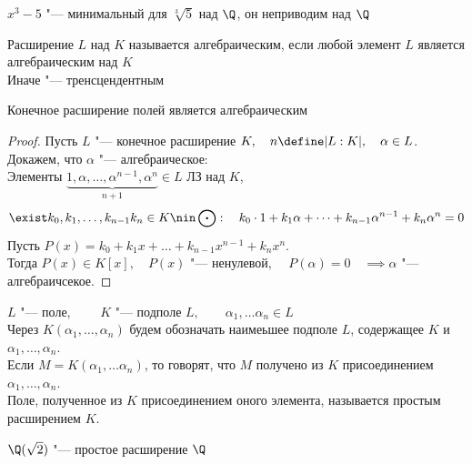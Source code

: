 \begin{eg}
	$ x^3 - 5 $ "--- минимальный для $ \sqrt[3]5 $ над $ \Q $, \as он неприводим над $ \Q $
\end{eg}

\begin{definition}
	Расширение $ L $ над $ K $ называется алгебраическим, если любой элемент $ L $ является алгебраическим над $ K $ \\
	Иначе "--- тренсцендентным
\end{definition}

\begin{theorem}
	Конечное расширение полей является алгебраическим
\end{theorem}

\begin{proof}
	Пусть $ L $ "--- конечное расширение $ K, \quad n \define |L : K|, \quad \alpha \in L $. \\
	Докажем, что $ \alpha $ "--- алгебраическое: \\
	Элементы $ \underbrace{1, \alpha, \dots, \alpha^{n - 1}, \alpha^n}_{n + 1} \in L $ ЛЗ над $ K $, \ie
	$$ \exist k_0, k_1, \dots, k_{n - 1} k_n \in K \nin \bigodot : \quad k_0 \cdot 1 + k_1 \alpha + \dots + k_{n - 1}\alpha^{n - 1} + k_n\alpha^n = 0 $$
	Пусть $ P(x) = k_0 + k_1x + \dots + k_{n - 1}x^{n - 1} + k_nx^n $. \\
	Тогда $ P(x) \in K[x], \quad P(x) $ "--- ненулевой, $ \quad P(\alpha) = 0 \quad \implies \alpha $ "--- алгебраичсекое.
\end{proof}

\begin{definition}
	$ L $ "--- поле, $ \qquad K $ "--- подполе $ L, \qquad \alpha_1, \dots \alpha_n \in L $ \\
	Через $ K(\alpha_1, \dots, \alpha_n) $ будем обозначать наимеьшее подполе $ L $, содержащее $ K $ и $ \alpha_1, \dots, \alpha_n $. \\
	Если $ M = K(\alpha_1, \dots \alpha_n) $, то говорят, что $ M $ получено из $ K $ присоединением $ \alpha_1, \dots, \alpha_n $. \\
	Поле, полученное из $ K $ присоединением оного элемента, называется простым расширением $ K $.
\end{definition}

\begin{eg}
	$ \Q(\sqrt2) $ "--- простое расширение $ \Q $
\end{eg}

